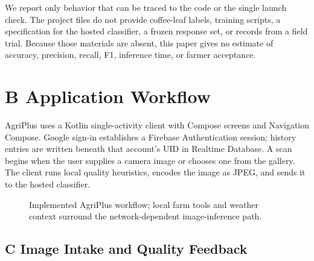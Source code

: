 \documentclass[conference]{IEEEtran}
\begin{document}
We report only behavior that can be traced to the code or the single launch check. The project files do not provide coffee-leaf labels, training scripts, a specification for the hosted classifier, a frozen response set, or records from a field trial. Because those materials are absent, this paper gives no estimate of accuracy, precision, recall, F1, inference time, or farmer acceptance.

\section*{B Application Workflow}

AgriPlus uses a Kotlin single-activity client with Compose screens and Navigation Compose. Google sign-in establishes a Firebase Authentication session; history entries are written beneath that account's UID in Realtime Database. A scan begins when the user supplies a camera image or chooses one from the gallery. The client runs local quality heuristics, encodes the image as JPEG, and sends it to the hosted classifier.

\begin{figure}[!t]
\centering
{}
\caption{Implemented AgriPlus workflow; local farm tools and weather context surround the network-dependent image-inference path.}
\label{fig:architecture}
\end{figure}

\subsection*{C Image Intake and Quality Feedback}
\end{document}

